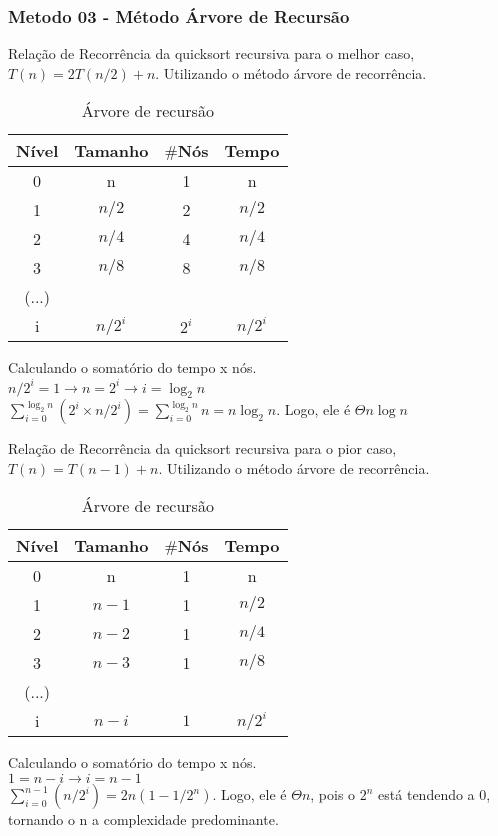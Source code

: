 \subsubsection{Metodo 03 - Método Árvore de Recursão}
Relação de Recorrência da quicksort recursiva para o melhor caso, $T(n) = 2T(n/2) + n$. Utilizando o método árvore de recorrência.

\begin{table}[ht!]
    \centering
    \begin{tabular}{|c|c|c|c|}
    \hline
    \textbf{Nível} & \textbf{Tamanho} & $\#$\textbf{Nós} & \textbf{Tempo} \\ \hline
     0 & n & 1 & n \\ \hline
     1 & $n/2$ & 2 & $n/2$ \\ \hline
     2 & $n/4$ & 4 & $n/4$ \\ \hline
     3 & $n/8$ & 8 & $n/8$ \\ \hline
     (...) & & & \\ \hline
     i & $n/2^i$ & $2^i$ & $n/2^i$ \\ \hline 
    \end{tabular}  
    \caption{Árvore de recursão}
\end{table}

Calculando o somatório do tempo x nós. \\
$n/2^i = 1 \rightarrow n = 2^i \rightarrow i = \log_2{n}$ \\
$\sum_{i=0}^{\log_2{n}} (2^i \times n/2^i) = \sum_{i=0}^{\log_2{n}} n = n \log_2{n}$. Logo, ele é $\Theta n \log{n}$ 

Relação de Recorrência da quicksort recursiva para o pior caso, $T(n) = T(n - 1) + n$. Utilizando o método árvore de recorrência.

\begin{table}[ht!]
    \centering
    \begin{tabular}{|c|c|c|c|}
    \hline
    \textbf{Nível} & \textbf{Tamanho} & $\#$\textbf{Nós} & \textbf{Tempo} \\ \hline
     0 & n & 1 & n \\ \hline
     1 & $n - 1$ & 1 & $n/2$ \\ \hline
     2 & $n - 2$ & 1 & $n/4$ \\ \hline
     3 & $n - 3$ & 1 & $n/8$ \\ \hline
     (...) & & & \\ \hline
     i & $n - i$ & $1$ & $n/2^i$ \\ \hline 
    \end{tabular}  
    \caption{Árvore de recursão}
\end{table}

Calculando o somatório do tempo x nós. \\
$1 = n -i \rightarrow i = n - 1$ \\
$\sum_{i = 0}^{n - 1} (n/2^i) = 2n(1 - 1/2^n)$. Logo, ele é $\Theta n$, pois o $2^n$ está tendendo a 0, tornando o n a complexidade predominante.